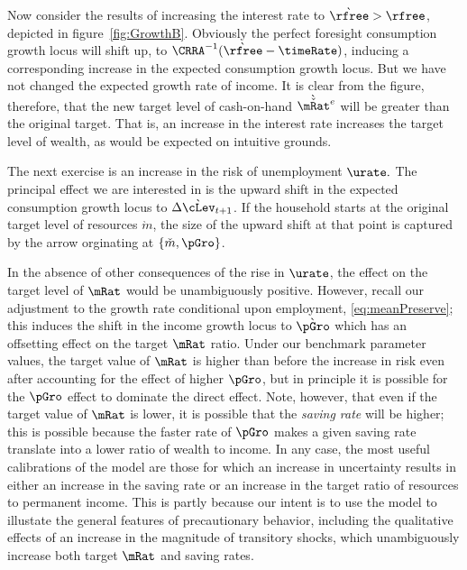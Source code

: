 \documentclass{handout}
\begin{document}
Now consider the results of increasing the interest rate to
$\grave{\rfree}>\rfree$, depicted in figure~\ref{fig:GrowthB}.  Obviously the perfect foresight consumption
growth locus will shift up, to $\CRRA^{-1}(\grave{\rfree}-\timeRate)$,
inducing a corresponding increase in the expected consumption growth
locus.  But we have not changed the expected growth rate of income.
It is clear from the figure, therefore, that the new target level of
cash-on-hand $\grave{\check{\mRat}}^{e}$ will be greater than the original target.
That is, an increase in the interest rate increases the target level
of wealth, as would be expected on intuitive grounds.

The next exercise is an increase in the risk of unemployment $\urate.$
The principal effect we are interested in is the upward shift in the expected
consumption growth locus to $\Delta \grave{\cLev}_{t+1}$.  If the
household starts at the original target level of resources
$\grave{m}$, the size of the upward shift at that point is captured by the
arrow orginating at $\{\check{m},\pGro\}$.  

In the absence of other consequences of the rise in $\urate$, the
effect on the target level of $\mRat$ would be unambiguously positive.
However, recall our adjustment to the growth rate conditional upon
employment, \eqref{eq:meanPreserve}; this induces the shift in the
income growth locus to $\grave{\pGro}$ which has an offsetting effect
on the target $\mRat$ ratio.  Under our benchmark parameter values,
the target value of $\mRat$ is higher than before the increase in risk
even after accounting for the effect of higher $\pGro$, but in
principle it is possible for the $\pGro$ effect to dominate the direct
effect.  Note, however, that even if the target value of $\mRat$ is
lower, it is possible that the {\it saving rate} will be higher; this
is possible because the faster rate of $\pGro$ makes a given saving
rate translate into a lower ratio of wealth to income.  In any case,
the most useful calibrations of the model are those for
which an increase in uncertainty results in either an increase in the
saving rate or an increase in the target ratio of resources to
permanent income.  This is partly because our intent is to use the
model to illustate the general features of precautionary behavior,
including the qualitative effects of an increase in the magnitude of
transitory shocks, which unambiguously increase both target $\mRat$
and saving rates.
\end{document}
